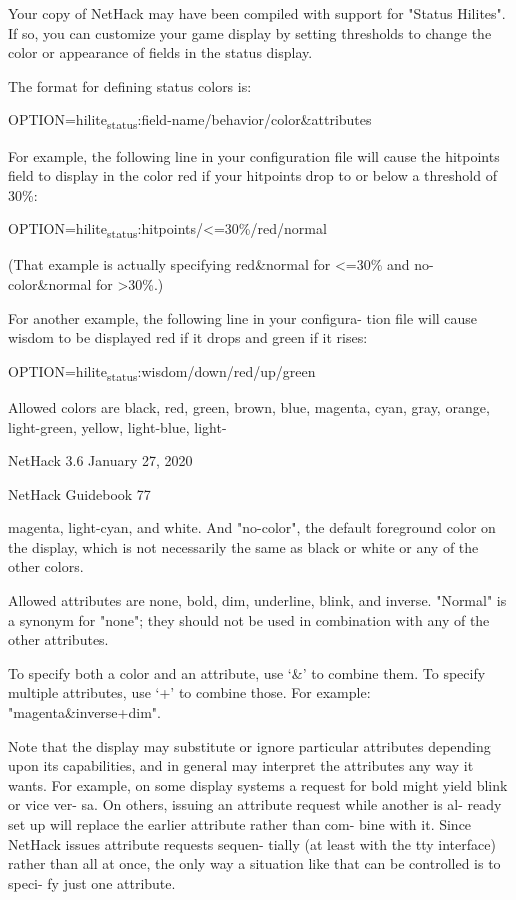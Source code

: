 \documentclass[11pt]{article}
\begin{document}
   Your copy of NetHack may have been compiled with support for
"Status Hilites". If so, you can customize your game display by
setting thresholds to change the color or appearance of fields in
the status display.

The format for defining status colors is:

OPTION=hilite\textsubscript{status}:field-name/behavior/color\&attributes

   For example, the following line in your configuration file
will cause the hitpoints field to display in the color red if
your hitpoints drop to or below a threshold of 30\%:

OPTION=hilite\textsubscript{status}:hitpoints/<=30\%/red/normal

(That example is actually specifying red\&normal for <=30\% and no-
color\&normal for >30\%.)

   For another example, the following line in your configura-
tion file will cause wisdom to be displayed red if it drops and
green if it rises:

OPTION=hilite\textsubscript{status}:wisdom/down/red/up/green

   Allowed colors are black, red, green, brown, blue, magenta,
cyan, gray, orange, light-green, yellow, light-blue, light-


NetHack 3.6                   January 27, 2020





NetHack Guidebook                       77



magenta, light-cyan, and white.  And "no-color", the default
foreground color on the display, which is not necessarily the
same as black or white or any of the other colors.

   Allowed attributes are none, bold, dim, underline, blink,
and inverse. "Normal" is a synonym for "none"; they should not
be used in combination with any of the other attributes.

   To specify both a color and an attribute, use `\&' to combine
them. To specify multiple attributes, use `+' to combine those.
For example: "magenta\&inverse+dim".

   Note that the display may substitute or ignore particular
attributes depending upon its capabilities, and in general may
interpret the attributes any way it wants. For example, on some
display systems a request for bold might yield blink or vice ver-
sa. On others, issuing an attribute request while another is al-
ready set up will replace the earlier attribute rather than com-
bine with it.  Since NetHack issues attribute requests sequen-
tially (at least with the tty interface) rather than all at once,
the only way a situation like that can be controlled is to speci-
fy just one attribute.
\end{document}
